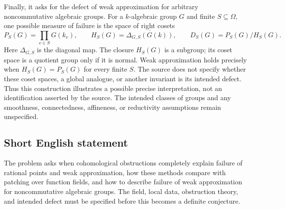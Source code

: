 \documentclass[11pt]{article}
\begin{document}
Finally, it asks for the defect of weak approximation for arbitrary noncommutative algebraic groups. For a \(k\)-algebraic group \(G\) and finite \(S\subseteq\Omega\), one possible measure of failure is the space of right cosets
\[
P_S(G)=\prod_{v\in S}G(k_v),\qquad
H_S(G)=\overline{\Delta_{G,S}(G(k))},\qquad
D_S(G)=P_S(G)/H_S(G).
\]
Here \(\Delta_{G,S}\) is the diagonal map. The closure \(H_S(G)\) is a subgroup; its coset space is a quotient group only if it is normal. Weak approximation holds precisely when \(H_S(G)=P_S(G)\) for every finite \(S\). The source does not specify whether these coset spaces, a global analogue, or another invariant is its intended defect. Thus this construction illustrates a possible precise interpretation, not an identification asserted by the source. The intended classes of groups and any smoothness, connectedness, affineness, or reductivity assumptions remain unspecified.
\subsection{Short English statement}
The problem asks when cohomological obstructions completely explain failure of rational points and weak approximation, how these methods compare with patching over function fields, and how to describe failure of weak approximation for noncommutative algebraic groups. The field, local data, obstruction theory, and intended defect must be specified before this becomes a definite conjecture.
\end{document}
